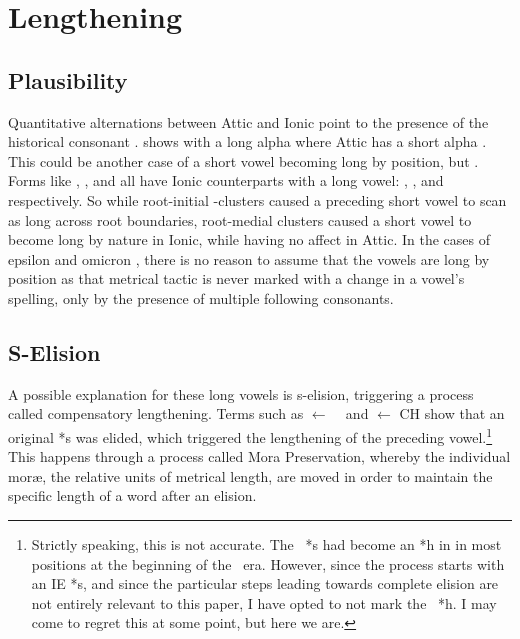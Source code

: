 \section{Lengthening}\label{sec:Lengthening}

\subsection{Plausibility}\label{subsec:Plausibility}
Quantitative alternations between Attic and Ionic point to the presence of the historical
consonant \w.  shows  with a long alpha  where
Attic has a short alpha . This could be another case of a short vowel
becoming long by position,
but . Forms like
, , and  all have Ionic counterparts with a long vowel:
, , and  respectively. So while root-initial \w-clusters caused
a preceding short vowel to scan as long across root boundaries, root-medial clusters caused a
short vowel to become long by nature in Ionic, while having no affect in Attic.
In the cases of epsilon  and omicron , there is no reason to
assume that the vowels are long by position
as that metrical tactic is never marked with a change in a vowel's spelling, only by the
presence of multiple following consonants.

\subsection{S-Elision}\label{subsec:SElision}
A possible explanation for these long vowels is s-elision, triggering a process called
compensatory lengthening. Terms such as  $\gets$ \CH\  and  $\gets$
CH  show that an original *s was elided, which triggered the lengthening of
the preceding vowel.\footnote{Strictly speaking, this is not accurate. The \IE\ *s had become an *h in
in most positions at the beginning of the \CH\ era. However, since the process starts with an IE *s,
and since the particular steps leading towards complete elision are not entirely relevant to this paper,
I have opted to not mark the \CH\ *h. I may come to regret this at some point, but here we are.}
This happens through a process called Mora Preservation, whereby the individual mor\ae,
the relative units of metrical length, are moved in order to maintain the specific length of a word
after an elision.

